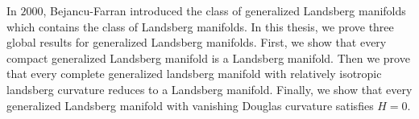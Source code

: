 
In $2000$, Bejancu-Farran introduced the class of generalized Landsberg  manifolds which contains the class of Landsberg manifolds. In this thesis, we prove three global results for generalized Landsberg manifolds. First, we show that every compact generalized Landsberg manifold is a Landsberg manifold. Then we prove that every complete generalized landsberg manifold with relatively isotropic landsberg curvature reduces to a Landsberg manifold. Finally, we show that every generalized Landsberg manifold with vanishing Douglas curvature satisfies $ H=0 $. 
